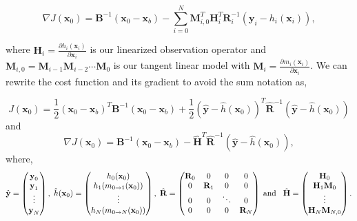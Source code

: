 \documentclass[11pt]{article}
\begin{document}
\begin{equation}
\nabla J(\textbf{x}_0) = \textbf{B}^{-1}(\textbf{x}_0-\textbf{x}_b)-\sum_{i=0}^{N}\textbf{M}_{i,0}^{T}\textbf{H}_i^{T}\textbf{R}_{i}^{-1}(\textbf{y}_i-h_i(\textbf{x}_i)),
\end{equation}

where $\textbf{H}_i = \frac{\partial h_i(\textbf{x}_i)}{\partial\textbf{x}_i}$ is our linearized observation operator and $\mathbf{M}_{i,0}=\mathbf{M}_{i-1}\mathbf{M}_{i-2}\cdots\mathbf{M}_0$ is our tangent linear model with $\mathbf{M}_i=\frac{\partial m_{i}(\textbf{x}_{i})}{\partial \textbf{x}_{i}}$. We can rewrite the cost function and its gradient to avoid the sum notation as,

\begin{equation}
J(\textbf{x}_0) = \frac{1}{2}(\textbf{x}_0-\textbf{x}_b)^{T}\textbf{B}^{-1}(\textbf{x}_0-\textbf{x}_b)+\frac{1}{2}(\hat{\textbf{y}}-\hat{h}(\textbf{x}_0))^{T}\hat{\textbf{R}}^{-1}(\hat{\textbf{y}}-\hat{h}(\textbf{x}_0)) \label{costfn}
\end{equation}
and
\begin{equation}
\nabla J(\textbf{x}_0) = \textbf{B}^{-1}(\textbf{x}_0-\textbf{x}_b)-\hat{\mathbf{H}}^{T}\hat{\textbf{R}}^{-1}(\hat{\textbf{y}}-\hat{h}(\textbf{x}_0)), \label{gradcostfn}
\end{equation}
where,
\begin{equation}
\hat{\textbf{y}}=
\begin{pmatrix}
\textbf{y}_0 \\
\textbf{y}_1\\
\vdots \\
\textbf{y}_N
\end{pmatrix},
\hspace{1mm}
\hat{h}(\textbf{x}_0)=
\begin{pmatrix}
h_0(\textbf{x}_0) \\
h_1(m_{0\rightarrow 1}(\mathbf{x}_{0}))\\
\vdots \\
h_N(m_{0\rightarrow N}(\mathbf{x}_{0}))
\end{pmatrix},
\hspace{1mm}
\hat{\mathbf{R}}=
\begin{pmatrix}
\mathbf{R}_0 & 0 & 0 & 0 \\
0 & \mathbf{R}_1 & 0 & 0 \\
0 & 0 & \ddots & 0 \\
0 & 0 & 0 & \mathbf{R}_N
\end{pmatrix}
\hspace{1mm} \text{and} \hspace{3mm}
\hat{\mathbf{H}}=
\begin{pmatrix}
\mathbf{H}_0 \\
\mathbf{H}_1\mathbf{M}_0\\
\vdots \\
\mathbf{H}_N\mathbf{M}_{N,0}
\end{pmatrix}.
\end{equation}
\end{document}
